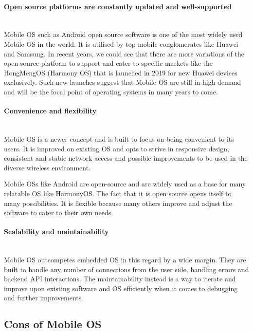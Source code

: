 \documentclass[conference]{IEEEtran}
\newcommand{\forceindent}{\leavevmode{\parindent=1em\indent}}
\begin{document}
\paragraph{Open source platforms are constantly updated and well-supported} \mbox{} \\
\forceindent Mobile OS such as Android open source software is one of the most widely used Mobile OS in the world. It is utilised by top mobile conglomerates like Huawei and Samsung. In recent years, we could see that there are more variations of the open source platform to support and cater to specific markets like the HongMengOS (Harmony OS) that is launched in 2019 for new Huawei devices exclusively\cite{HuaweiHongmeng}. Such new launches suggest that Mobile OS are still in high demand and will be the focal point of operating systems in many years to come. \\

\paragraph{Convenience and flexibility} \mbox{} \\
\forceindent Mobile OS is a newer concept and is built to focus on being convenient to its users. It is improved on existing OS and opts to strive in responsive design, consistent and stable network access and possible improvements to be used in the diverse wireless environment\cite{technopedia}.

\smallskip
\forceindent Mobile OSs like Android are open-source and are widely used as a base for many relatable OS like HarmonyOS. The fact that it is open source opens itself to many possibilities. It is flexible because many others improve and adjust the software to cater to their own needs.

\medskip
\paragraph{Scalability and maintainability}\mbox{} \\
\forceindent Mobile OS outcompetes embedded OS in this regard by a wide margin. They are built to handle any number of connections from the user side, handling errors and backend API interactions\cite{mediumScalability}. The maintainability instead is a way to iterate and improve upon existing software and OS efficiently when it comes to debugging and further improvements.\\

\subsection{Cons of Mobile OS}
\end{document}
